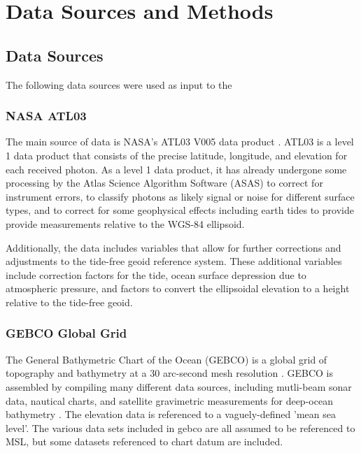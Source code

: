 \chapter{Data Sources and Methods}
\section{Data Sources}
The following data sources were used as input to the 
\subsection{NASA ATL03}

The main source of data is NASA's ATL03 V005 data product \parencite{icesat2data}. ATL03 is a level 1 data product that consists of the precise latitude, longitude, and elevation for each received photon. As a level 1 data product, it has already undergone some processing by the Atlas Science Algorithm Software (ASAS) to correct for instrument errors, to classify photons as likely signal or noise for different surface types, and to correct for some geophysical effects including earth tides to provide provide measurements relative to the WGS-84 ellipsoid. 

Additionally, the data includes variables that allow for further corrections and adjustments to the tide-free geoid reference system. These additional variables include correction factors for the tide, ocean surface depression due to atmospheric pressure, and factors to convert the ellipsoidal elevation to a height relative to the tide-free geoid.

\subsection{GEBCO Global Grid}

The General Bathymetric Chart of the Ocean (GEBCO) is a global grid of topography and bathymetry at a 30 arc-second mesh resolution \parencite{gebco2021griddata}. GEBCO is assembled by compiling many different data sources, including mutli-beam sonar data, nautical charts, and satellite gravimetric measurements for deep-ocean bathymetry \parencite{gebcocookbook}. The elevation data is referenced to a vaguely-defined 'mean sea level'. The various data sets included in gebco are all assumed to be referenced to MSL, but some datasets referenced to chart datum are included. 

